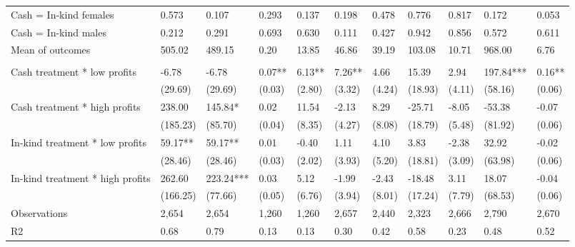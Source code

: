 \documentclass{report}
\begin{document}
\begin{table}[H]
{\begin{tabular}{lllllllllll}
\hspace{1em}\hspace{1em} Cash = In-kind females & 0.573 & 0.107 & 0.293 & 0.137 & 0.198 & 0.478 & 0.776 & 0.817 & 0.172 & 0.053\\
\hspace{1em}\hspace{1em} Cash = In-kind males & 0.212 & 0.291 & 0.693 & 0.630 & 0.111 & 0.427 & 0.942 & 0.856 & 0.572 & 0.611\\
\hspace{1em}Mean of outcomes & 505.02 & 489.15 & 0.20 & 13.85 & 46.86 & 39.19 & 103.08 & 10.71 & 968.00 & 6.76\\
\addlinespace[0.3em]
\multicolumn{11}{l}{\textbf{Panel B: Female sub-sample}}\\
\hspace{1em}Cash treatment * low profits & -6.78 & -6.78 & 0.07** & 6.13** & 7.26** & 4.66 & 15.39 & 2.94 & 197.84*** & 0.16**\\
\hspace{1em} & (29.69) & (29.69) & (0.03) & (2.80) & (3.32) & (4.24) & (18.93) & (4.11) & (58.16) & (0.06)\\
\hspace{1em}Cash treatment * high profits & 238.00 & 145.84* & 0.02 & 11.54 & -2.13 & 8.29 & -25.71 & -8.05 & -53.38 & -0.07\\
\hspace{1em} & (185.23) & (85.70) & (0.04) & (8.35) & (4.27) & (8.08) & (18.79) & (5.48) & (81.92) & (0.06)\\
\hspace{1em}In-kind treatment * low profits & 59.17** & 59.17** & 0.01 & -0.40 & 1.11 & 4.10 & 3.83 & -2.38 & 32.92 & -0.02\\
\hspace{1em} & (28.46) & (28.46) & (0.03) & (2.02) & (3.93) & (5.20) & (18.81) & (3.09) & (63.98) & (0.06)\\
\hspace{1em}In-kind treatment * high profits & 262.60 & 223.24*** & 0.03 & 5.12 & -1.99 & -2.43 & -18.48 & 3.11 & 18.07 & -0.04\\
\hspace{1em} & (166.25) & (77.66) & (0.05) & (6.76) & (3.94) & (8.01) & (17.24) & (7.79) & (68.53) & (0.06)\\
\hspace{1em}Observations & 2,654 & 2,654 & 1,260 & 1,260 & 2,657 & 2,440 & 2,323 & 2,666 & 2,790 & 2,670\\
\hspace{1em}R2 & 0.68 & 0.79 & 0.13 & 0.13 & 0.30 & 0.42 & 0.58 & 0.23 & 0.48 & 0.52\\

\end{tabular}}
\end{table}
\end{document}
